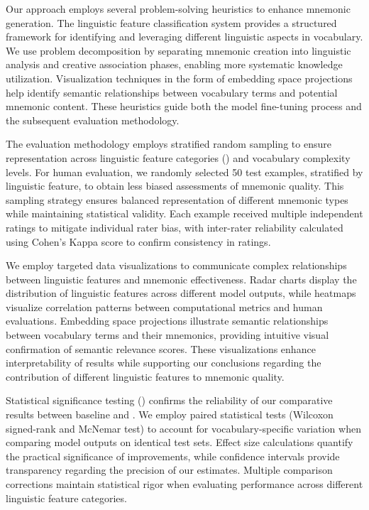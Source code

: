  Our approach employs several problem-solving heuristics to enhance mnemonic generation. The linguistic feature classification system provides a structured framework for identifying and leveraging different linguistic aspects in vocabulary. We use problem decomposition by separating mnemonic creation into linguistic analysis and creative association phases, enabling more systematic knowledge utilization. Visualization techniques in the form of embedding space projections help identify semantic relationships between vocabulary terms and potential mnemonic content. These heuristics guide both the model fine-tuning process and the subsequent evaluation methodology.

 The evaluation methodology employs stratified random sampling to ensure representation across linguistic feature categories () and vocabulary complexity levels. For human evaluation, we randomly selected 50 test examples, stratified by linguistic feature, to obtain less biased assessments of mnemonic quality. This sampling strategy ensures balanced representation of different mnemonic types while maintaining statistical validity. Each example received multiple independent ratings to mitigate individual rater bias, with inter-rater reliability calculated using Cohen's Kappa score to confirm consistency in ratings.

 We employ targeted data visualizations to communicate complex relationships between linguistic features and mnemonic effectiveness. Radar charts display the distribution of linguistic features across different model outputs, while heatmaps visualize correlation patterns between computational metrics and human evaluations. Embedding space projections illustrate semantic relationships between vocabulary terms and their mnemonics, providing intuitive visual confirmation of semantic relevance scores. These visualizations enhance interpretability of results while supporting our conclusions regarding the contribution of different linguistic features to mnemonic quality.

 Statistical significance testing () confirms the reliability of our comparative results between baseline and \linksys. We employ paired statistical tests (Wilcoxon signed-rank and McNemar test) to account for vocabulary-specific variation when comparing model outputs on identical test sets. Effect size calculations quantify the practical significance of improvements, while confidence intervals provide transparency regarding the precision of our estimates. Multiple comparison corrections maintain statistical rigor when evaluating performance across different linguistic feature categories.

